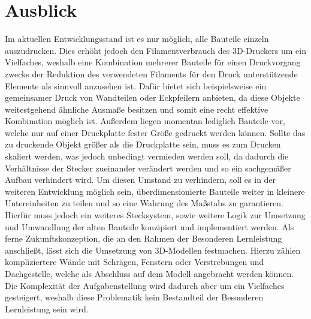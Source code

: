 \chapter{Ausblick}
Im aktuellen Entwicklungsstand ist es nur möglich, alle Bauteile einzeln auszudrucken. 
Dies erhöht jedoch den Filamentverbrauch des 3D-Druckers um ein Vielfaches, weshalb eine Kombination mehrerer Bauteile für einen Druckvorgang zwecks der Reduktion des verwendeten Filaments für den Druck unterstützende Elemente als sinnvoll anzusehen ist. 
Dafür bietet sich beispielsweise ein gemeinsamer Druck von Wandteilen oder Eckpfeilern anbieten, da diese Objekte weitestgehend ähnliche Ausmaße besitzen und somit eine recht effektive Kombination möglich ist.
Außerdem liegen momentan lediglich Bauteile vor, welche nur auf einer Druckplatte fester Größe gedruckt werden können. 
Sollte das zu druckende Objekt größer als die Druckplatte sein, muss es zum Drucken skaliert werden, was jedoch unbedingt vermieden werden soll, da dadurch die Verhältnisse der Stecker zueinander verändert werden und so ein sachgemäßer Aufbau verhindert wird. 
Um diesen Umstand zu verhindern, soll es in der weiteren Entwicklung möglich sein, überdimensionierte Bauteile weiter in kleinere Untereinheiten zu teilen und so eine Wahrung des Maßstabs zu garantieren. 
Hierfür muss jedoch ein weiteres Stecksystem, sowie weitere Logik zur Umsetzung und Umwandlung der alten Bauteile konzipiert und implementiert werden.
Als ferne Zukunftskonzeption, die an den Rahmen der Besonderen Lernleistung anschließt, lässt sich die Umsetzung von 3D-Modellen festmachen. 
Hierzu zählen kompliziertere Wände mit Schrägen, Fenstern oder Verstrebungen und Dachgestelle, welche als Abschluss auf dem Modell angebracht werden können. 
Die Komplexität der Aufgabenstellung wird dadurch aber um ein Vielfaches gesteigert, weshalb diese Problematik kein Bestandteil der Besonderen Lernleistung sein wird.
